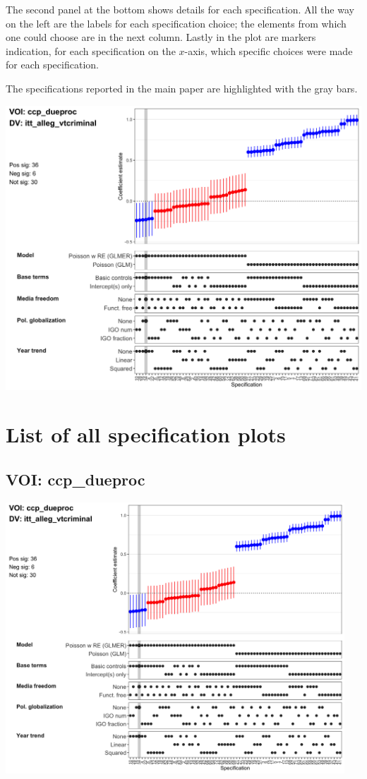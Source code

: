 \documentclass[]{article}
\begin{document}
The second panel at the bottom shows details for each specification. All
the way on the left are the labels for each specification choice; the
elements from which one could choose are in the next column. Lastly in
the plot are markers indication, for each specification on the
\(x\)-axis, which specific choices were made for each specification.

The specifications reported in the main paper are highlighted with the
gray bars.

\includegraphics{../output/figures-robustness/specplot-ccp_dueproc-itt_alleg_vtcriminal.png}

\hypertarget{list-of-all-specification-plots}{%
\section{List of all specification
plots}\label{list-of-all-specification-plots}}

\hypertarget{voi-ccp_dueproc}{%
\subsection{VOI: ccp\_dueproc}\label{voi-ccp_dueproc}}

\includegraphics[height=4in]{../output/figures-robustness/specplot-ccp_dueproc-itt_alleg_vtcriminal.png}
\end{document}
